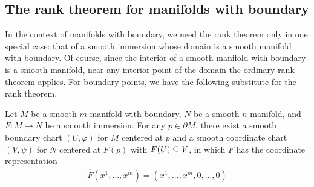 \subsection{The rank theorem for manifolds with boundary}
In the context of manifolds with boundary, we need the rank theorem only in one special case: that of a smooth immersion whose domain is a smooth manifold with boundary. Of course, since the interior of a smooth manifold with boundary is a smooth manifold, near any interior point of the domain the ordinary rank theorem applies. For boundary points, we have the following substitute for the rank theorem.
\begin{theorem}\label{rank thm manifold boundary}
Let $M$ be a smooth $m$-manifold with boundary, $N$ be a smooth $n$-manifold, and $F:M\to N$ be a smooth immersion. For any $p\in\partial M$, there exist a smooth boundary chart $(U,\varphi)$ for $M$ centered at $p$ and a smooth coordinate chart $(V,\psi)$ for $N$ centered at $F(p)$ with $F(U)\subseteq V$, in which $F$ has the coordinate representation
\begin{align}\label{rank thm boundary-1}
\widehat{F}(x^1,\dots,x^m)=(x^1,\dots,x^m,0,\dots,0)
\end{align}
\end{theorem}
